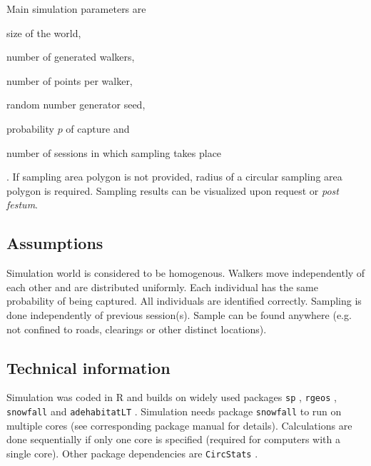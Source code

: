 \documentclass[a4paper]{article}
\begin{document}
   Main simulation parameters are \begin{inparaenum} \item size of the world, \item number of generated walkers, \item number of points per walker, \item random number generator seed, \item probability $p$ of capture and \item number of sessions in which sampling takes place\end{inparaenum}. If sampling area polygon is not provided, radius of a circular sampling area polygon is required. Sampling results can be visualized upon request or \emph{post festum}.
   
   \subsection{Assumptions}
   Simulation world is considered to be homogenous. Walkers move independently of each other and are distributed uniformly. Each individual has the same probability of being captured. All individuals are identified correctly. Sampling is done independently of previous session(s). Sample can be found anywhere (e.g. not confined to roads, clearings or other distinct locations).
   
   
   \subsection{Technical information}
   Simulation was coded in R \citep{r2012} and builds on widely used packages \texttt{sp} \citep{bivand2008}, 
   \texttt{rgeos} \citep{bivand2012},
   \texttt{snowfall} \citep{knaus2010} and \texttt{adehabitatLT} \citep{calenge2006}.
   Simulation needs package \texttt{snowfall} to run on multiple cores (see corresponding package manual for details). Calculations are done sequentially if only one core is specified (required for computers with a single core). Other package dependencies are \texttt{CircStats} \citep{lund2009}.
   
   
   
   
   
   
\end{document}
